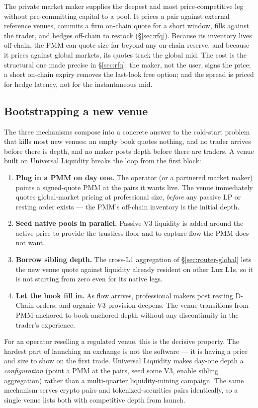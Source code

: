 The private market maker supplies the deepest and most price-competitive
leg without pre-committing capital to a pool. It prices a pair against
external reference venues, commits a firm on-chain quote for a short
window, fills against the trader, and hedges off-chain to restock
(\S\ref{sec:rfq}). Because its inventory lives off-chain, the PMM can quote
size far beyond any on-chain reserve, and because it prices against global
markets, its quotes track the global mid. The cost is the structural one
made precise in \S\ref{sec:rfq}: the maker, not the user, signs the price;
a short on-chain expiry removes the last-look free option; and the spread
is priced for hedge latency, not for the instantaneous mid.

\subsection{Bootstrapping a new venue}
\label{sec:provision-bootstrap}

The three mechanisms compose into a concrete answer to the cold-start
problem that kills most new venues: an empty book quotes nothing, and no
trader arrives before there is depth, and no maker posts depth before there
are traders. A venue built on Universal Liquidity breaks the loop from the
first block:

\begin{enumerate}[label=\textbf{B\arabic*.}]
  \item \textbf{Plug in a PMM on day one.} The operator (or a partnered
  market maker) points a signed-quote PMM at the pairs it wants live. The
  venue immediately quotes global-market pricing at professional size,
  \emph{before} any passive LP or resting order exists --- the PMM's
  off-chain inventory is the initial depth.
  \item \textbf{Seed native pools in parallel.} Passive V3 liquidity is
  added around the active price to provide the trustless floor and to
  capture flow the PMM does not want.
  \item \textbf{Borrow sibling depth.} The cross-L1 aggregation of
  \S\ref{sec:router-global} lets the new venue quote against liquidity
  already resident on other Lux L1s, so it is not starting from zero even
  for its native legs.
  \item \textbf{Let the book fill in.} As flow arrives, professional makers
  post resting D-Chain orders, and organic V3 provision deepens. The venue
  transitions from PMM-anchored to book-anchored depth without any
  discontinuity in the trader's experience.
\end{enumerate}

\begin{remark}
For an operator reselling a regulated venue, this is the decisive property.
The hardest part of launching an exchange is not the software --- it is
having a price and size to show on the first trade. Universal Liquidity
makes day-one depth a \emph{configuration} (point a PMM at the pairs, seed
some V3, enable sibling aggregation) rather than a multi-quarter
liquidity-mining campaign. The same mechanism serves crypto pairs and
tokenized-securities pairs identically, so a single venue lists both with
competitive depth from launch.
\end{remark}
